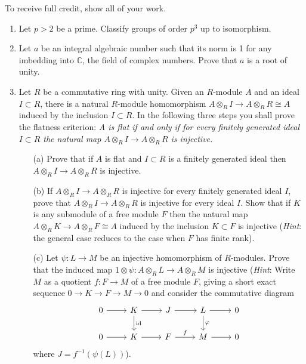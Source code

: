 \documentclass{article}
\begin{document}
To receive full credit, show all of your work.

\begin{enumerate}
    \item Let \(p > 2\) be a prime. Classify groups of order \(p^3\) up to isomorphism.

    \item Let \(a\) be an integral algebraic number such that its norm is 1 for any imbedding into \(\mathbb{C}\), the field of complex numbers. Prove that \(a\) is a root of unity.

    \item Let \(R\) be a commutative ring with unity. Given an \(R\)-module \(A\) and an ideal \(I \subset R\), there is a natural \(R\)-module homomorphism \(A \otimes_R I \to A \otimes_R R \cong A\) induced by the inclusion \(I \subset R\). In the following three steps you shall prove the flatness criterion: \textit{A is flat if and only if for every finitely generated ideal \(I \subset R\) the natural map \(A \otimes_R I \to A \otimes_R R\) is injective.}
    \begin{itemize}
        \item[(a)] Prove that if \(A\) is flat and \(I \subset R\) is a finitely generated ideal then \(A \otimes_R I \to A \otimes_R R\) is injective.
        \item[(b)] If \(A \otimes_R I \to A \otimes_R R\) is injective for every finitely generated ideal \(I\), prove that \(A \otimes_R I \to A \otimes_R R\) is injective for every ideal \(I\). Show that if \(K\) is any submodule of a free module \(F\) then the natural map \(A \otimes_R K \to A \otimes_R F \cong A\) induced by the inclusion \(K \subset F\) is injective (\textit{Hint}: the general case reduces to the case when \(F\) has finite rank).
        \item[(c)] Let \(\psi : L \to M\) be an injective homomorphism of \(R\)-modules. Prove that the induced map \(1 \otimes \psi : A \otimes_R L \to A \otimes_R M\) is injective (\textit{Hint}: Write \(M\) as a quotient \(f : F \to M\) of a free module \(F\), giving a short exact sequence \(0 \to K \to F \to M \to 0\) and consider the commutative diagram
        \[\begin{tikzcd}
            0 & K & J & L & 0 \\
            0 & K & F & M & 0
            \arrow[from=1-1, to=1-2]
            \arrow[from=1-2, to=1-3]
            \arrow["{\text{id}}", from=1-2, to=2-2]
            \arrow[from=1-3, to=1-4]
            \arrow[from=1-4, to=1-5]
            \arrow["\varphi", from=1-4, to=2-4]
            \arrow[from=2-1, to=2-2]
            \arrow[from=2-2, to=2-3]
            \arrow["f", from=2-3, to=2-4]
            \arrow[from=2-4, to=2-5]
        \end{tikzcd}\]
        where \(J = f^{-1}(\psi(L))\)).
    \end{itemize}


\end{enumerate}
\end{document}
